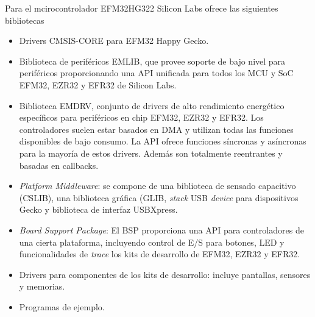
Para el mcirocontrolador EFM32HG322 Silicon Labs ofrece las siguientes bibliotecas \citep{EmLibSiliconLabs}

\begin{itemize}
\item
Drivers CMSIS-CORE para EFM32 Happy Gecko.
\item
Biblioteca de periféricos EMLIB, que provee soporte de bajo nivel para periféricos proporcionando una API unificada para todos los MCU y SoC EFM32, EZR32 y EFR32 de Silicon Labs.
\item
Biblioteca EMDRV, conjunto de drivers de alto rendimiento energético específicos para periféricos en chip EFM32, EZR32 y EFR32. Los controladores suelen estar basados en DMA y utilizan todas las funciones disponibles de bajo consumo. La API ofrece funciones síncronas y asíncronas para la mayoría de estos drivers. Además son totalmente reentrantes y basadas en callbacks.
\item
\emph{Platform Middleware}: se compone de una biblioteca de sensado capacitivo (CSLIB), una biblioteca gráfica (GLIB, \emph{stack} USB \emph{device} para dispositivos Gecko y biblioteca de interfaz USBXpress.
\item
\emph{Board Support Package}: El BSP proporciona una API para controladores de una cierta plataforma, incluyendo control de E/S para botones, LED y funcionalidades de \emph{trace} los kits de desarrollo de EFM32, EZR32 y EFR32.
\item
Drivers para componentes de los kits de desarrollo: incluye pantallas, sensores y memorias.
\item
Programas de ejemplo.
\end{itemize}
